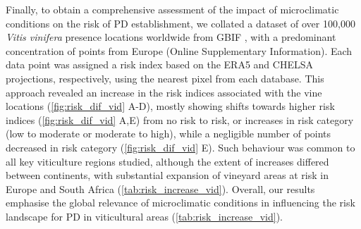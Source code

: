 Finally, to obtain a comprehensive assessment of the impact of
microclimatic conditions on the risk of PD establishment, we collated a dataset
of over 100,000 \textit {Vitis vinifera} presence locations worldwide from GBIF
\cite{GBIF}, with a predominant concentration of points from Europe
(Online Supplementary Information). Each data point was assigned a risk index
based on
the ERA5 and CHELSA projections, respectively, using the nearest pixel from
each database. This approach revealed an increase in the risk indices
associated with the vine locations (\cref{fig:risk_dif_vid} A-D), mostly
showing shifts towards higher risk indices (\cref{fig:risk_dif_vid} A,E) from
no risk to risk, or increases in risk category (low to moderate or moderate to
high), while a negligible number of points decreased in risk category
(\cref{fig:risk_dif_vid} E). Such behaviour was common to all key viticulture
regions studied, although the extent of increases differed between continents,
with substantial expansion of vineyard areas at risk in Europe and South Africa
(\cref{tab:risk_increase_vid}). Overall, our results emphasise the global
relevance of microclimatic conditions in influencing the risk landscape for PD
in viticultural areas (\cref{tab:risk_increase_vid}).

\begin{table}[H]
    \centering
    \caption{Comparison of grapevine presence locations at risk in key
        viticulture regions using CHELSA and ERA5 datasets}
    \label{tab:risk_increase_vid}
\end{table}


